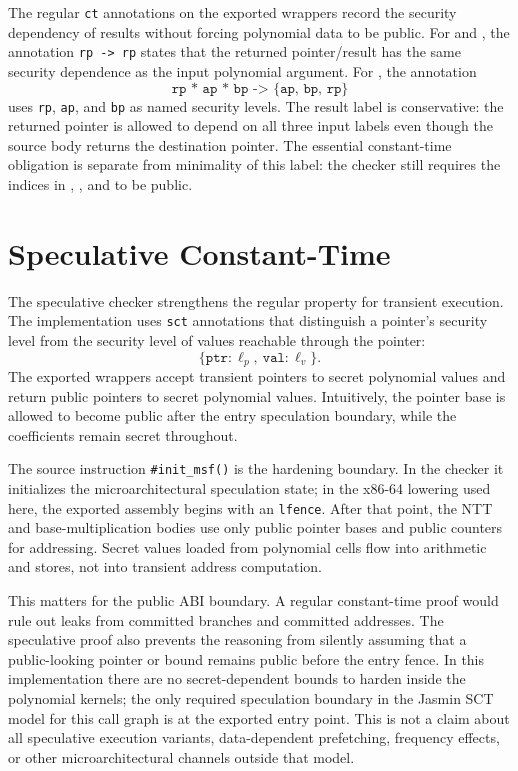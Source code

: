 \documentclass[10pt,twocolumn]{article}
\newcommand{\jasmin}{Jasmin}
\newcommand{\ct}{constant-time}
\begin{document}
The regular \texttt{ct} annotations on the exported wrappers record the
security dependency of results without forcing polynomial data to be public.
For  and , the annotation
\texttt{rp -> rp} states that the returned pointer/result has the same security
dependence as the input polynomial argument.  For , the
annotation
\[
  \texttt{rp * ap * bp -> \{ap, bp, rp\}}
\]
uses \texttt{rp}, \texttt{ap}, and \texttt{bp} as named security levels.  The
result label is conservative: the returned pointer is allowed to depend on all
three input labels even though the source body returns the destination pointer.
The essential \ct{} obligation is separate from minimality of this label: the
checker still requires the indices in , , and
 to be public.

\section{Speculative Constant-Time}

The speculative checker strengthens the regular property for transient
execution.  The implementation uses \texttt{sct} annotations that distinguish a
pointer's security level from the security level of values reachable through the
pointer:
\[
  \{\texttt{ptr}:\ell_p,\ \texttt{val}:\ell_v\}.
\]
The exported wrappers accept transient pointers to secret polynomial values and
return public pointers to secret polynomial values.  Intuitively, the pointer
base is allowed to become public after the entry speculation boundary, while
the coefficients remain secret throughout.

The source instruction \texttt{\#init\_msf()} is the hardening boundary.  In the
checker it initializes the microarchitectural speculation state; in the x86-64
lowering used here, the exported assembly begins with an \texttt{lfence}.  After
that point, the NTT and base-multiplication bodies use only public pointer bases
and public counters for addressing.  Secret values loaded from polynomial cells
flow into arithmetic and stores, not into transient address computation.

This matters for the public ABI boundary.  A regular \ct{} proof would rule out
leaks from committed branches and committed addresses.  The speculative proof
also prevents the reasoning from silently assuming that a public-looking pointer
or bound remains public before the entry fence.  In this implementation there
are no secret-dependent bounds to harden inside the polynomial kernels; the only
required speculation boundary in the \jasmin{} SCT model for this call graph is
at the exported entry point.  This is not a claim about all speculative
execution variants, data-dependent prefetching, frequency effects, or other
microarchitectural channels outside that model.
\end{document}

